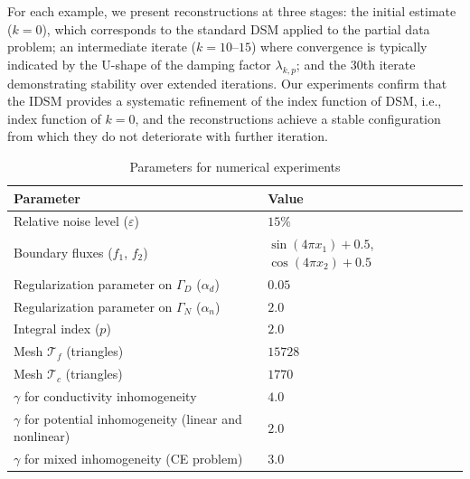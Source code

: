 \documentclass[onefignum,onetabnum]{siamart190516}
\numberwithin{equation}{section}
\begin{document}
{
For each example, we present reconstructions at three stages: the initial estimate ($k = 0$), which corresponds to the standard DSM applied to the partial data problem; an intermediate iterate ($k=10$–$15$) where convergence is typically indicated by the U-shape of the damping factor $\lambda_{k,p}$; and the $30$th iterate demonstrating stability over extended iterations.
Our experiments confirm that the IDSM provides a systematic refinement of the index function of DSM, i.e., index function of $k=0$, and the reconstructions achieve a stable configuration from which they do not deteriorate with further iteration.
}

\begin{table}[hbt!]
\centering
\caption{Parameters for numerical experiments}
\label{table1}
\begin{tabular}{ll}
\hline
\textbf{Parameter} & \textbf{Value} \\
\hline
Relative noise level ($\varepsilon$) & $15\%$ \\
Boundary fluxes ($f_1$, $f_2$) & $\sin(4\pi x_1)+0.5$, $\cos(4\pi x_2)+0.5$ \\
Regularization parameter on $\Gamma_D$ ($\alpha_{d}$) & $0.05$ \\
Regularization parameter on $\Gamma_N$ ($\alpha_{n}$) & $2.0$ \\
Integral index ($p$)& $2.0$\\
Mesh $\mathscr{T}_f$ (triangles) & $15728$ \\
Mesh $\mathscr{T}_c$ (triangles) & $1770$ \\
$\gamma$ for conductivity inhomogeneity & $4.0$ \\
$\gamma$ for potential inhomogeneity (linear and nonlinear) & $2.0$ \\
$\gamma$ for mixed inhomogeneity (CE problem) & $3.0$ \\
\hline
\end{tabular}
\end{table}
\end{document}
